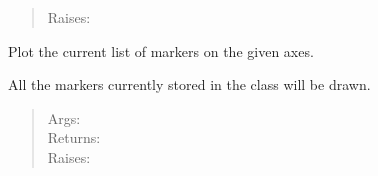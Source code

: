\documentclass[a4paper,10pt,english]{sphinxmanual}
\begin{document}
\begin{fulllineitems}
\begin{fulllineitems}
\begin{quote}
\begin{description}
\item[{Raises:}] \leavevmode
{}

\end{description}
\end{quote}

\end{fulllineitems}


\begin{fulllineitems}
\label{ryplot:pyradi.ryplot.Markers.plot}
Plot the current list of markers on the given axes.

All the markers currently stored in the class will be
drawn.
\begin{quote}
\begin{description}
\item[{Args:}] \leavevmode
{}

\item[{Returns:}] \leavevmode
{}

\item[{Raises:}] \leavevmode
{}

\end{description}
\end{quote}

\end{fulllineitems}


\end{fulllineitems}

\end{document}
